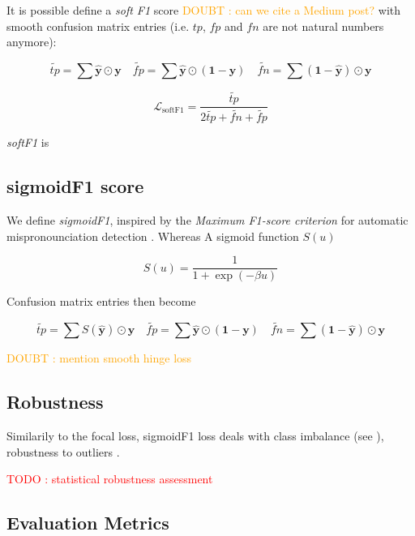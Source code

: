 \documentclass[sigconf,natbib,screen=true,review=true,anonymous]{acmart}
\newcommand\todo[1]{\textcolor{red}{TODO : #1}}
\newcommand\doubt[1]{\textcolor{orange}{DOUBT : #1}}
\begin{document}
It is possible define a \emph{soft F1} score \cite{softF1} \doubt{can we cite a Medium post?} with smooth confusion matrix entries (i.e. \(tp\), \(fp\) and \(fn\) are not natural numbers anymore):

$$
\tilde{tp}=\sum \hat{\mathbf{y}} \odot \mathbf{y} \quad \tilde{fp} = \sum \hat{\mathbf{y}} \odot (\mathbf{1}- \mathbf{y}) \quad \tilde{fn} = \sum (\mathbf{1} - \hat{\mathbf{y}}) \odot \mathbf{y}
$$

\begin{equation}
\mathcal{L}_{\text {softF1}}= \frac{\tilde{tp}}{2 \tilde{tp}+ \tilde{fn}+ \tilde{fp}}
\end{equation}

\emph{softF1} is 

\subsection{sigmoidF1 score}
\label{sec:orgfed6431}

We define \emph{sigmoidF1}, inspired by the \emph{Maximum F1-score criterion} for automatic mispronounciation detection \cite{sigmoid}. Whereas 
A sigmoid function \(S(u)\)

\begin{equation}
S(u)=\frac{1}{1+\exp (-\beta u)}
\end{equation}

Confusion matrix entries then become

$$
\tilde{tp}=\sum S(\hat{\mathbf{y}}) \odot \mathbf{y} \quad \tilde{fp} = \sum \hat{\mathbf{y}} \odot (\mathbf{1} - \mathbf{y}) \quad \tilde{fn} = \sum (\mathbf{1} - \hat{\mathbf{y}}) \odot \mathbf{y}
$$

\doubt{mention smooth hinge loss} \cite{smoothHinge}


\subsection{Robustness}
\label{sec:org1f81b76}


Similarily to the focal loss, sigmoidF1 loss deals with class imbalance (see \cite{focalLoss}), robustness to outliers \cite{focalLoss}.

\todo{statistical robustness assessment}



\subsection{Evaluation Metrics}
\label{sec:orgd72cc2d}
\end{document}
